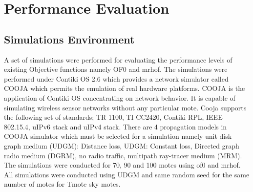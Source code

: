 \chapter{Performance Evaluation} \label{Performance Evaluation}
\section{Simulations Environment} \label{Simulations Environment}
A set of simulations were performed for evaluating the performance levels of existing Objective functions namely OF0 and mrhof. The simulations were performed under Contiki OS 2.6 which provides a network simulator called COOJA which permits the emulation of real hardware platforms. COOJA is the application of Contiki OS concentrating on network behavior. It is capable of simulating wireless sensor networks without any particular mote. Cooja supports the following set of standards; TR 1100, TI CC2420, Contiki-RPL, IEEE 802.15.4, uIPv6 stack and uIPv4 stack.\cite{3} There are 4 propagation models in COOJA simulator which must be selected for a simulation namely unit disk graph medium (UDGM): Distance loss, UDGM: Constant loss, Directed graph radio medium (DGRM), no radio traffic, multipath ray-tracer medium (MRM).\\
The simulations were conducted for 70, 90 and 100 motes using of0 and mrhof. All simulations were conducted using UDGM and same random seed for the same number of motes for Tmote sky motes.

